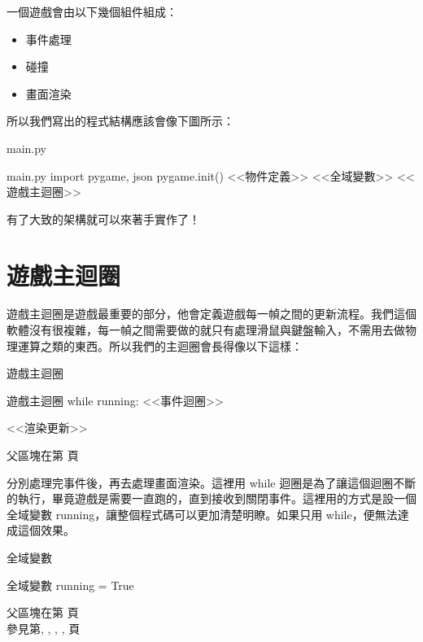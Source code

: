 \documentclass[12pt, a4paper]{siweb}
\begin{document}
一個遊戲會由以下幾個組件組成：

\begin{itemize}
\item 事件處理
\item 碰撞
\item 畫面渲染
\end{itemize}

所以我們寫出的程式結構應該會像下圖所示：

\begin{siweb}{main.py}
\begin{mylisting}{main.py}
import pygame, json
pygame.init()
<<物件定義>>
<<全域變數>>
<<遊戲主迴圈>>
\end{mylisting}
\label{main.py_0}\label{物件定義_father}\label{全域變數_father}\label{遊戲主迴圈_father}

\end{siweb}

有了大致的架構就可以來著手實作了！

\section{遊戲主迴圈}

遊戲主迴圈是遊戲最重要的部分，他會定義遊戲每一幀之間的更新流程。我們這個軟體沒有很複雜，每一幀之間需要做的就只有處理滑鼠與鍵盤輸入，不需用去做物理運算之類的東西。所以我們的主迴圈會長得像以下這樣：

\begin{siweb}{遊戲主迴圈}
\begin{mylisting}{遊戲主迴圈}
while running:
	<<事件迴圈>>
		
	<<渲染更新>>
\end{mylisting}
\label{遊戲主迴圈_0}\label{事件迴圈_father}\label{渲染更新_father}
父區塊在第\pageref{遊戲主迴圈_father} 頁
\end{siweb}

分別處理完事件後，再去處理畫面渲染。這裡用 while 迴圈是為了讓這個迴圈不斷的執行，畢竟遊戲是需要一直跑的，直到接收到關閉事件。這裡用的方式是設一個全域變數 running，讓整個程式碼可以更加清楚明瞭。如果只用 while，便無法達成這個效果。

\begin{siweb}{全域變數}
\begin{mylisting}{全域變數}
running = True
\end{mylisting}
\label{全域變數_0}
父區塊在第\pageref{全域變數_father} 頁\\參見第\pageref{全域變數_0}, \pageref{全域變數_1}, \pageref{全域變數_2}, \pageref{全域變數_3}, 頁
\end{siweb}
\end{document}

